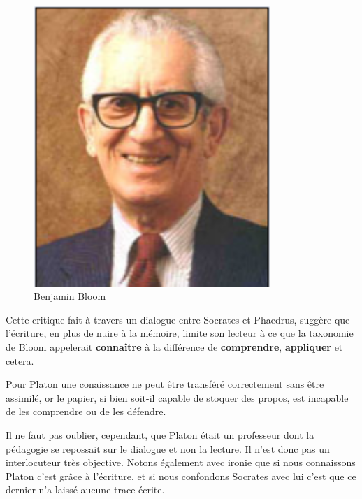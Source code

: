 \begin{minipage}[H]{0.3\linewidth}
  \begin{figure}[H]
  \centering
  \includegraphics[width=0.8\textwidth]{../resources/illustrations/bloom_face}
  \caption{Benjamin Bloom}
  \end{figure}
\end{minipage}
\begin{minipage}[H]{0.69\linewidth}
Cette critique fait à travers un dialogue entre Socrates et Phaedrus, suggère que l'écriture, en plus de nuire à la mémoire, limite son lecteur à ce que la taxonomie de Bloom\cite{tax-bloom} appelerait \textbf{connaître} à la différence de \textbf{comprendre}, \textbf{appliquer} et cetera. 

Pour Platon une conaissance ne peut être transféré correctement sans être assimilé, or le papier, si bien soit-il capable de stoquer des propos, est incapable de les comprendre ou de les défendre.
\vspace{1cm}
\end{minipage}

Il ne faut pas oublier, cependant, que Platon était un professeur dont la pédagogie se repossait sur le dialogue et non la lecture. Il n'est donc pas un interlocuteur très objective. Notons également avec ironie que si nous connaissons Platon c'est grâce à l'écriture, et si nous confondons Socrates avec lui c'est que ce dernier n'a laissé aucune trace écrite.

